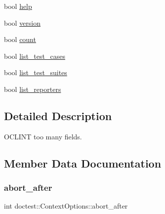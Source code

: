 \begin{DoxyCompactItemize}
\item 
bool \mbox{\hyperlink{structdoctest_1_1_context_options_a9d542a95ee03f61c233fff51e7461400}{help}}
\item 
bool \mbox{\hyperlink{structdoctest_1_1_context_options_a08931527a9e5e634e64a336e5493a7c1}{version}}
\item 
bool \mbox{\hyperlink{structdoctest_1_1_context_options_a4651b5efbaf2ffc03d60fb4140d21dd3}{count}}
\item 
bool \mbox{\hyperlink{structdoctest_1_1_context_options_a813e1543c358ab8a7a432b4ad2b32e56}{list\+\_\+test\+\_\+cases}}
\item 
bool \mbox{\hyperlink{structdoctest_1_1_context_options_a579399a66b278cbf96b6183d337f486b}{list\+\_\+test\+\_\+suites}}
\item 
bool \mbox{\hyperlink{structdoctest_1_1_context_options_ad3daf077ac3182db5175f8baff49fce0}{list\+\_\+reporters}}
\end{DoxyCompactItemize}


\subsection{Detailed Description}
O\+C\+L\+I\+NT too many fields. 

\subsection{Member Data Documentation}
\mbox{\label{structdoctest_1_1_context_options_a8ba5bfec2229bc2da9ab917f4bdee5e7}} 
\subsubsection{\texorpdfstring{abort\+\_\+after}{abort\_after}}
{\footnotesize\ttfamily int doctest\+::\+Context\+Options\+::abort\+\_\+after}

\mbox{\label{structdoctest_1_1_context_options_a0590006b4d10296c9a697e32ff886f74}} 
